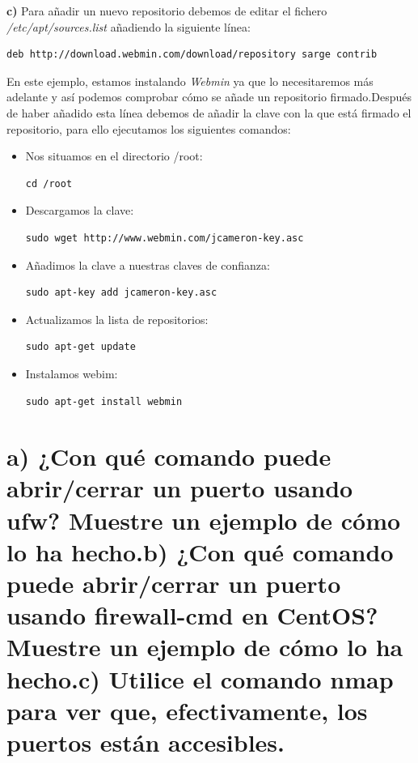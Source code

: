 \textbf{c) } Para añadir un nuevo repositorio debemos de editar el fichero \textit{/etc/apt/sources.list} añadiendo la siguiente línea: \begin{verbatim}deb http://download.webmin.com/download/repository sarge contrib\end{verbatim} En este ejemplo, estamos instalando \textit{Webmin}\cite{webmin} ya que lo necesitaremos más adelante y así podemos comprobar cómo se añade un repositorio firmado.\newline Después de haber añadido esta línea debemos de añadir la clave con la que está firmado el repositorio, para ello ejecutamos los siguientes comandos:
\begin{itemize}
	\item Nos situamos en el directorio /root: \begin{verbatim}cd /root\end{verbatim}
	\item Descargamos la clave: \begin{verbatim}sudo wget http://www.webmin.com/jcameron-key.asc\end{verbatim}
	\item Añadimos la clave a nuestras claves de confianza: \begin{verbatim}sudo apt-key add jcameron-key.asc\end{verbatim}
	\item Actualizamos la lista de repositorios: \begin{verbatim}sudo apt-get update\end{verbatim}
	\item Instalamos webim: \begin{verbatim}sudo apt-get install webmin\end{verbatim}
\end{itemize}
\section{\textbf{a)} ¿Con qué comando puede abrir/cerrar un puerto usando
	ufw? Muestre un ejemplo de cómo lo ha hecho.\newline \textbf{b)} ¿Con qué comando puede
	abrir/cerrar un puerto usando firewall-cmd en CentOS? Muestre un ejemplo
	de cómo lo ha hecho.\newline \textbf{c)} Utilice el comando nmap para ver que,
	efectivamente, los puertos están accesibles.}

